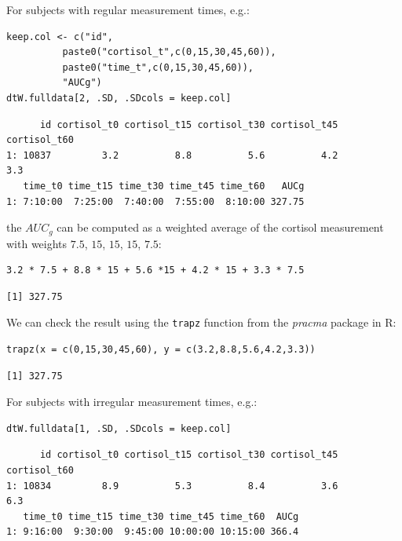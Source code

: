 \documentclass[12pt]{article}
\begin{document}
For subjects with regular measurement times, e.g.:
\lstset{language=r,label= ,caption= ,captionpos=b,numbers=none}
\begin{lstlisting}
keep.col <- c("id", 
	      paste0("cortisol_t",c(0,15,30,45,60)),
	      paste0("time_t",c(0,15,30,45,60)),
	      "AUCg")
dtW.fulldata[2, .SD, .SDcols = keep.col]
\end{lstlisting}

\begin{verbatim}
      id cortisol_t0 cortisol_t15 cortisol_t30 cortisol_t45 cortisol_t60
1: 10837         3.2          8.8          5.6          4.2          3.3
   time_t0 time_t15 time_t30 time_t45 time_t60   AUCg
1: 7:10:00  7:25:00  7:40:00  7:55:00  8:10:00 327.75
\end{verbatim}

the \(AUC_g\) can be computed as a weighted average of the cortisol
measurement with weights \(7.5\), \(15\), \(15\), \(15\), \(7.5\):
\lstset{language=r,label= ,caption= ,captionpos=b,numbers=none}
\begin{lstlisting}
3.2 * 7.5 + 8.8 * 15 + 5.6 *15 + 4.2 * 15 + 3.3 * 7.5
\end{lstlisting}

\begin{verbatim}
[1] 327.75
\end{verbatim}


We can check the result using the \texttt{trapz} function from the \emph{pracma} package in R:
\lstset{language=r,label= ,caption= ,captionpos=b,numbers=none}
\begin{lstlisting}
trapz(x = c(0,15,30,45,60), y = c(3.2,8.8,5.6,4.2,3.3))
\end{lstlisting}

\begin{verbatim}
[1] 327.75
\end{verbatim}


For subjects with irregular measurement times, e.g.:
\lstset{language=r,label= ,caption= ,captionpos=b,numbers=none}
\begin{lstlisting}
dtW.fulldata[1, .SD, .SDcols = keep.col]
\end{lstlisting}

\begin{verbatim}
      id cortisol_t0 cortisol_t15 cortisol_t30 cortisol_t45 cortisol_t60
1: 10834         8.9          5.3          8.4          3.6          6.3
   time_t0 time_t15 time_t30 time_t45 time_t60  AUCg
1: 9:16:00  9:30:00  9:45:00 10:00:00 10:15:00 366.4
\end{verbatim}
\end{document}
